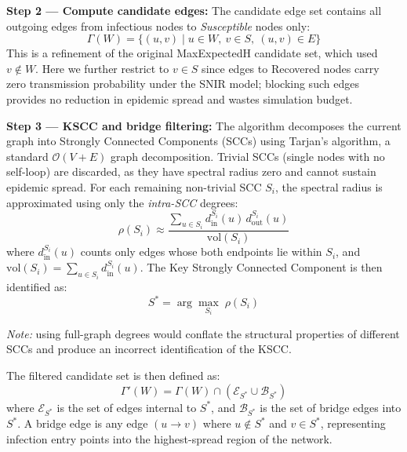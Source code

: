 \documentclass[conference]{IEEEtran}
\begin{document}
\vspace{0.5em}

\textbf{Step 2 — Compute candidate edges:}  
The candidate edge set contains all outgoing edges from infectious nodes to \emph{Susceptible} nodes only:
\begin{equation}
\Gamma(W) = \{(u,v) \mid u \in W,\ v \in S,\ (u,v) \in E\}
\end{equation}
This is a refinement of the original MaxExpectedH candidate set, which used $v \notin W$. Here we further restrict to $v \in S$ since edges to Recovered nodes carry zero transmission probability under the SNIR model; blocking such edges provides no reduction in epidemic spread and wastes simulation budget.

\vspace{0.5em}

\textbf{Step 3 — KSCC and bridge filtering:}  
The algorithm decomposes the current graph into Strongly Connected Components (SCCs) using Tarjan's algorithm, a standard $\mathcal{O}(V+E)$ graph decomposition. Trivial SCCs (single nodes with no self-loop) are discarded, as they have spectral radius zero and cannot sustain epidemic spread. For each remaining non-trivial SCC $S_i$, the spectral radius is approximated using only the \emph{intra-SCC} degrees:
\begin{equation}
\rho(S_i) \approx \frac{\displaystyle\sum_{u \in S_i} d_{\mathrm{in}}^{S_i}(u)\, d_{\mathrm{out}}^{S_i}(u)}{\mathrm{vol}(S_i)}
\end{equation}
where $d_{\mathrm{in}}^{S_i}(u)$ counts only edges whose both endpoints lie within $S_i$, and $\mathrm{vol}(S_i) = \sum_{u \in S_i} d_{\mathrm{in}}^{S_i}(u)$. The Key Strongly Connected Component is then identified as:
\begin{equation}
S^* = \arg\max_{S_i} \; \rho(S_i)
\end{equation}

\textit{Note:} using full-graph degrees would conflate the structural properties of different SCCs and produce an incorrect identification of the KSCC.

The filtered candidate set is then defined as:
\begin{equation}
\Gamma'(W) = \Gamma(W) \cap \left(\mathcal{E}_{S^*} \cup \mathcal{B}_{S^*}\right)
\end{equation}
where $\mathcal{E}_{S^*}$ is the set of edges internal to $S^*$, and $\mathcal{B}_{S^*}$ is the set of bridge edges into $S^*$. A bridge edge is any edge $(u \to v)$ where $u \notin S^*$ and $v \in S^*$, representing infection entry points into the highest-spread region of the network.
\end{document}
